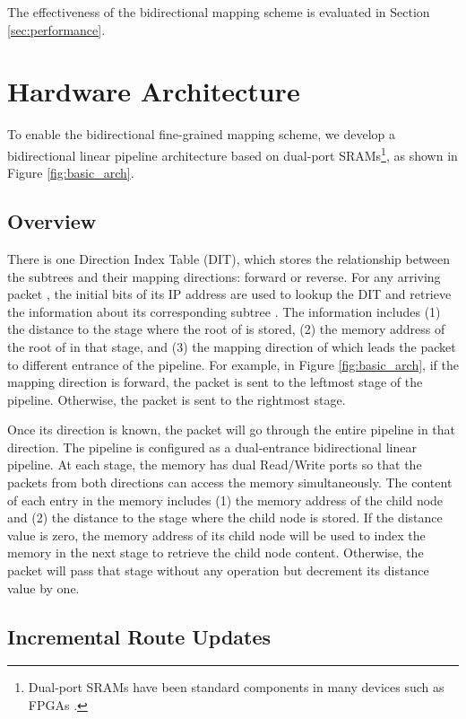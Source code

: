 \documentclass{sigcomm-alternate}
\begin{document}
The effectiveness of the bidirectional mapping scheme is evaluated in Section \ref{sec:performance}.



\section{Hardware Architecture}
\label{sec:arch}

To enable the bidirectional fine-grained mapping scheme, we develop a bidirectional linear pipeline architecture based on dual-port SRAMs\footnote{Dual-port SRAMs have been standard components in many devices such as FPGAs \cite{xilinx:virtex}.}, as shown in Figure \ref{fig:basic_arch}.

\subsection{Overview}

There is one Direction Index Table (DIT), which stores the relationship between the subtrees and their mapping directions: forward or reverse. For any arriving packet , the initial bits of its IP address are used to lookup the DIT and retrieve the information about its corresponding subtree . The information includes (1) the distance to the stage where the root of  is stored, (2) the memory address of the root of  in that stage, and (3) the mapping direction of  which leads the packet to different entrance of the pipeline. For example, in Figure \ref{fig:basic_arch}, if the mapping direction is forward, the packet is sent to the leftmost stage of the pipeline. Otherwise, the packet is sent to the rightmost stage. 

Once its direction is known, the packet will go through the entire pipeline in that direction. The pipeline is configured as a dual-entrance bidirectional linear pipeline. At each stage, the memory has dual Read/Write ports so that the packets from both directions can access the memory simultaneously. The content of each entry in the memory includes (1) the memory address of the child node and (2) the distance to the stage where the child node is stored. If the distance value is zero, the memory address of its child node will be used to index the memory in the next stage to retrieve the child node content. Otherwise, the packet will pass that stage without any operation but decrement its distance value by one.


\subsection{Incremental Route Updates}
\end{document}

